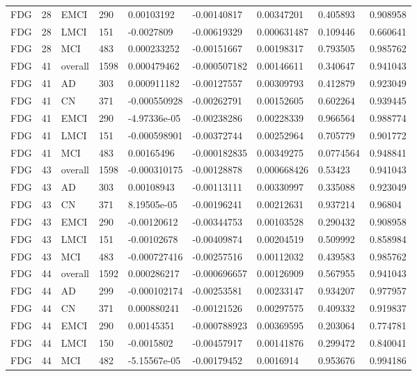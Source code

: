 \begin{landscape}
\begin{longtable}{lllllllll}
FDG & 28 & EMCI & 290 & 0.00103192 & -0.00140817 & 0.00347201 & 0.405893 & 0.908958 \\
FDG & 28 & LMCI & 151 & -0.0027809 & -0.00619329 & 0.000631487 & 0.109446 & 0.660641 \\
FDG & 28 & MCI & 483 & 0.000233252 & -0.00151667 & 0.00198317 & 0.793505 & 0.985762 \\
FDG & 41 & overall & 1598 & 0.000479462 & -0.000507182 & 0.00146611 & 0.340647 & 0.941043 \\
FDG & 41 & AD & 303 & 0.000911182 & -0.00127557 & 0.00309793 & 0.412879 & 0.923049 \\
FDG & 41 & CN & 371 & -0.000550928 & -0.00262791 & 0.00152605 & 0.602264 & 0.939445 \\
FDG & 41 & EMCI & 290 & -4.97336e-05 & -0.00238286 & 0.00228339 & 0.966564 & 0.988774 \\
FDG & 41 & LMCI & 151 & -0.000598901 & -0.00372744 & 0.00252964 & 0.705779 & 0.901772 \\
FDG & 41 & MCI & 483 & 0.00165496 & -0.000182835 & 0.00349275 & 0.0774564 & 0.948841 \\
FDG & 43 & overall & 1598 & -0.000310175 & -0.00128878 & 0.000668426 & 0.53423 & 0.941043 \\
FDG & 43 & AD & 303 & 0.00108943 & -0.00113111 & 0.00330997 & 0.335088 & 0.923049 \\
FDG & 43 & CN & 371 & 8.19505e-05 & -0.00196241 & 0.00212631 & 0.937214 & 0.96804 \\
FDG & 43 & EMCI & 290 & -0.00120612 & -0.00344753 & 0.00103528 & 0.290432 & 0.908958 \\
FDG & 43 & LMCI & 151 & -0.00102678 & -0.00409874 & 0.00204519 & 0.509992 & 0.858984 \\
FDG & 43 & MCI & 483 & -0.000727416 & -0.00257516 & 0.00112032 & 0.439583 & 0.985762 \\
FDG & 44 & overall & 1592 & 0.000286217 & -0.000696657 & 0.00126909 & 0.567955 & 0.941043 \\
FDG & 44 & AD & 299 & -0.000102174 & -0.00253581 & 0.00233147 & 0.934207 & 0.977957 \\
FDG & 44 & CN & 371 & 0.000880241 & -0.00121526 & 0.00297575 & 0.409332 & 0.919837 \\
FDG & 44 & EMCI & 290 & 0.00145351 & -0.000788923 & 0.00369595 & 0.203064 & 0.774781 \\
FDG & 44 & LMCI & 150 & -0.0015802 & -0.00457917 & 0.00141876 & 0.299472 & 0.840041 \\
FDG & 44 & MCI & 482 & -5.15567e-05 & -0.00179452 & 0.0016914 & 0.953676 & 0.994186 \\

\end{longtable}
\end{landscape}
